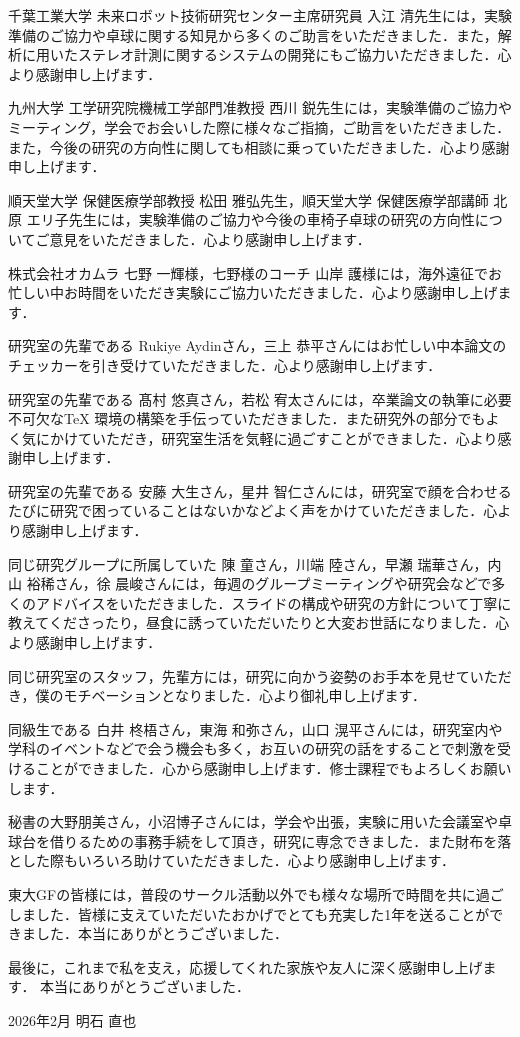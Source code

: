 \documentclass[../main]{subfiles}
\begin{document}
千葉工業大学 未来ロボット技術研究センター主席研究員 入江 清先生には，実験準備のご協力や卓球に関する知見から多くのご助言をいただきました．また，解析に用いたステレオ計測に関するシステムの開発にもご協力いただきました．心より感謝申し上げます．

九州大学 工学研究院機械工学部門准教授 西川 鋭先生には，実験準備のご協力やミーティング，学会でお会いした際に様々なご指摘，ご助言をいただきました．また，今後の研究の方向性に関しても相談に乗っていただきました．心より感謝申し上げます．

順天堂大学 保健医療学部教授 松田 雅弘先生，順天堂大学 保健医療学部講師 北原 エリ子先生には，実験準備のご協力や今後の車椅子卓球の研究の方向性についてご意見をいただきました．心より感謝申し上げます．

株式会社オカムラ 七野 一輝様，七野様のコーチ 山岸 護様には，海外遠征でお忙しい中お時間をいただき実験にご協力いただきました．心より感謝申し上げます．

研究室の先輩である Rukiye Aydinさん，三上 恭平さんにはお忙しい中本論文のチェッカーを引き受けていただきました．心より感謝申し上げます．

研究室の先輩である 髙村 悠真さん，若松 宥太さんには，卒業論文の執筆に必要不可欠なTeX 環境の構築を手伝っていただきました．また研究外の部分でもよく気にかけていただき，研究室生活を気軽に過ごすことができました．心より感謝申し上げます．

研究室の先輩である 安藤 大生さん，星井 智仁さんには，研究室で顔を合わせるたびに研究で困っていることはないかなどよく声をかけていただきました．心より感謝申し上げます．

同じ研究グループに所属していた 陳 童さん，川端 陸さん，早瀬 瑞華さん，内山 裕稀さん，徐 晨峻さんには，毎週のグループミーティングや研究会などで多くのアドバイスをいただきました．スライドの構成や研究の方針について丁寧に教えてくださったり，昼食に誘っていただいたりと大変お世話になりました．心より感謝申し上げます．

同じ研究室のスタッフ，先輩方には，研究に向かう姿勢のお手本を見せていただき，僕のモチベーションとなりました．心より御礼申し上げます．

同級生である 白井 柊梧さん，東海 和弥さん，山口 滉平さんには，研究室内や学科のイベントなどで会う機会も多く，お互いの研究の話をすることで刺激を受けることができました．心から感謝申し上げます．修士課程でもよろしくお願いします．

秘書の大野朋美さん，小沼博子さんには，学会や出張，実験に用いた会議室や卓球台を借りるための事務手続をして頂き，研究に専念できました．また財布を落とした際もいろいろ助けていただきました．心より感謝申し上げます．

東大GFの皆様には，普段のサークル活動以外でも様々な場所で時間を共に過ごしました．皆様に支えていただいたおかげでとても充実した1年を送ることができました．本当にありがとうございました．

最後に，これまで私を支え，応援してくれた家族や友人に深く感謝申し上げます．
本当にありがとうございました．

\begin{flushright}
  2026年2月 明石 直也
\end{flushright}

\end{document}
